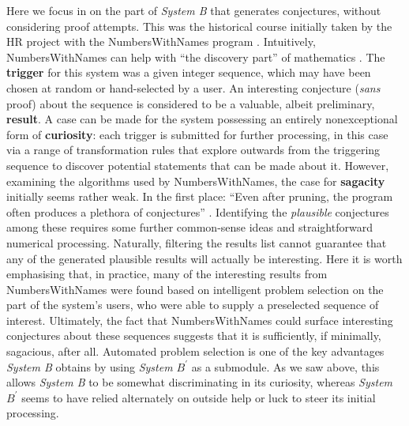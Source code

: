 Here we focus in on the part of \emph{System B} that generates
conjectures, without considering proof attempts.  This was the
historical course initially taken by the {\sf HR} project with the
{\sf NumbersWithNames} program \cite{colton2002numberswithnames}.
Intuitively, {\sf NumbersWithNames} can help with ``the discovery
part'' of mathematics \cite[p.~7]{colton2002numberswithnames}.
The \textbf{trigger} for this system was a given integer sequence,
which may have been chosen at random or hand-selected by a user.  An
interesting conjecture (\emph{sans} proof) about the sequence is
considered to be a valuable, albeit preliminary, \textbf{result}.  A
case can be made for the system possessing an entirely nonexceptional
form of \textbf{curiosity}: each trigger is submitted for further
processing, in this case via a range of transformation rules that
explore outwards from the triggering sequence to discover potential
statements that can be made about it.  However, examining the
algorithms used by {\sf NumbersWithNames}, the case for
\textbf{sagacity} initially seems rather weak.  In the first place:
``Even after pruning, the program often produces a plethora of
conjectures'' \cite[p.~4]{colton2002numberswithnames}.  Identifying
the \emph{plausible} conjectures among these requires some further
common-sense ideas and straightforward numerical processing.
Naturally, filtering the results list cannot guarantee that any of the
generated plausible results will actually be interesting.  Here it is
worth emphasising that, in practice, many of the interesting results
from {\sf NumbersWithNames} were found based on intelligent problem
selection on the part of the system's users, who were able to supply a
preselected sequence of interest.  Ultimately, the fact that {\sf
  NumbersWithNames} could surface interesting conjectures about these
sequences suggests that it is sufficiently, if minimally, sagacious,
after all.
Automated problem selection is one of the key advantages \emph{System
  B} obtains by using \emph{System $B^{\prime}$} as a submodule.  As
we saw above, this allows \emph{System B} to be somewhat
discriminating in its curiosity, whereas \emph{System $B^{\prime}$}
seems to have relied alternately on outside help or luck to steer its
initial processing.

